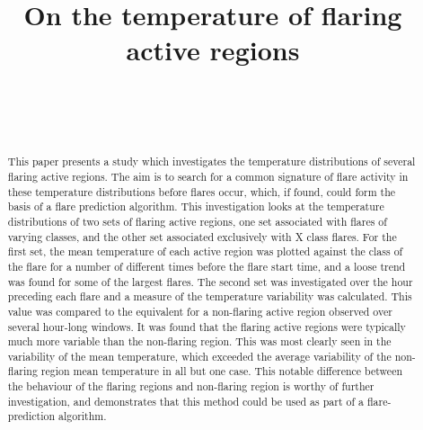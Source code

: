\documentclass[namedreferences]{solarphysics}
\begin{document}
\begin{article}
\begin{opening}

\title{On the temperature of flaring active regions}

\author[addressref=aff1,corref,email={a.j.leonard@sheffield.ac.uk}]{~}%
\author[addressref=aff2,email={hum2@aber.ac.uk}]{~}%

\address[id=aff1]{University of Sheffield}
\address[id=aff2]{Aberystwyth University}


\begin{abstract}
This paper presents a study which investigates the temperature distributions of several flaring active regions.
The aim is to search for a common signature of flare activity in these temperature distributions before flares occur, which, if found, could form the basis of a flare prediction algorithm.
This investigation looks at the temperature distributions of two sets of flaring active regions, one set associated with flares of varying classes, and the other set associated exclusively with X class flares.
For the first set, the mean temperature of each active region was plotted against the class of the flare for a number of different times before the flare start time, and a loose trend was found for some of the largest flares.
The second set was investigated over the hour preceding each flare and a measure of the temperature variability was calculated.
This value was compared to the equivalent for a non-flaring active region observed over several hour-long windows.
It was found that the flaring active regions were typically much more variable than the non-flaring region.
This was most clearly seen in the variability of the mean temperature, which exceeded the average variability of the non-flaring region mean temperature in all but one case.
This notable difference between the behaviour of the flaring regions and non-flaring region is worthy of further investigation, and demonstrates that this method could be used as part of a flare-prediction algorithm.
\end{abstract}
\keywords{}
\end{opening}


\end{article}
\end{document}
